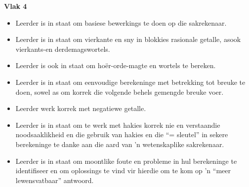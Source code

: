 \textbf{Vlak 4}\begin{itemize}[noitemsep]
\item
Leerder is in staat om basiese bewerkings te doen op die sakrekenaar.
\item
Leerder is in staat om vierkante en sny in blokkies rasionale getalle,
asook vierkants-en derdemagswortels.
\item
Leerder is ook in staat om ho\"{e}r-orde-magte en wortels te bereken.
\item
Leerder is in staat om eenvoudige berekeninge met betrekking tot
breuke te doen, sowel as om korrek die volgende behels gemengde breuke
voer.
\item
Leerder werk korrek met negatiewe getalle.
\item
Leerder is in staat om te werk met hakies korrek nie en verstaan ​​die
noodsaaklikheid en die gebruik van hakies en die ``= sleutel'' in sekere
berekeninge te danke aan die aard van 'n wetenskaplike sakrekenaar.
\item
Leerder is in staat om moontlike foute en probleme in hul berekeninge
te identifiseer en om oplossings te vind vir hierdie om te kom op 'n
``meer lewensvatbaar'' antwoord.
\end{itemize}

